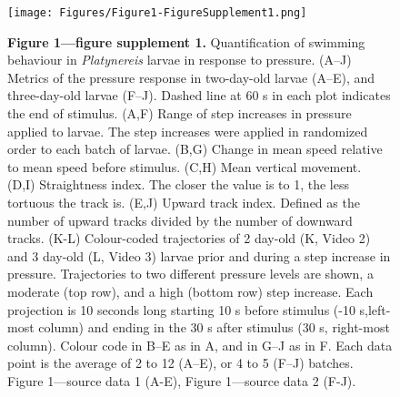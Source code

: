 \documentclass[
  11pt,
]{article}
\begin{document}
\begin{figure}[H]

{\centering \texttt{[image: Figures/Figure1-FigureSupplement1.png]}

}

\caption{\textbf{Figure 1---figure supplement 1. } Quantification of
swimming behaviour in \emph{Platynereis} larvae in response to pressure.
(A--J) Metrics of the pressure response in two-day-old larvae (A--E),
and three-day-old larvae (F--J). Dashed line at 60 s in each plot
indicates the end of stimulus. (A,F) Range of step increases in pressure
applied to larvae. The step increases were applied in randomized order
to each batch of larvae. (B,G) Change in mean speed relative to mean
speed before stimulus. (C,H) Mean vertical movement. (D,I) Straightness
index. The closer the value is to 1, the less tortuous the track is.
(E,J) Upward track index. Defined as the number of upward tracks divided
by the number of downward tracks. (K-L) Colour-coded trajectories of 2
day-old (K, Video 2) and 3 day-old (L, Video 3) larvae prior and during
a step increase in pressure. Trajectories to two different pressure
levels are shown, a moderate (top row), and a high (bottom row) step
increase. Each projection is 10 seconds long starting 10 s before
stimulus (-10 s,left-most column) and ending in the 30 s after stimulus
(30 s, right-most column). Colour code in B--E as in A, and in G--J as
in F. Each data point is the average of 2 to 12 (A--E), or 4 to 5 (F--J)
batches. Figure 1---source data 1 (A-E), Figure 1---source data 2
(F-J).}

\end{figure}%
\end{document}
